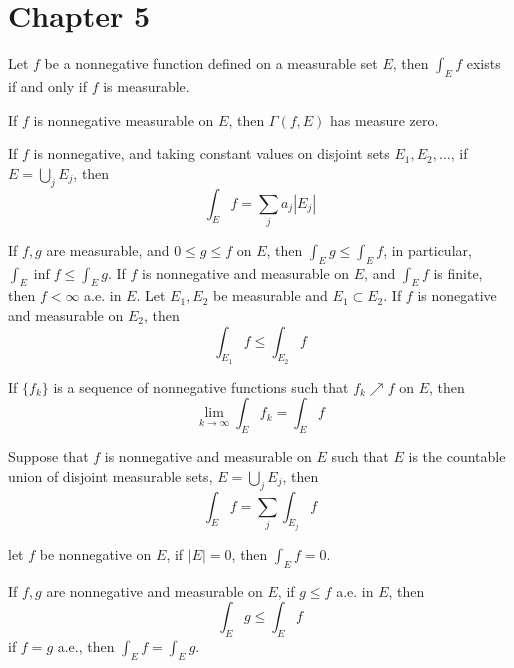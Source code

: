 \documentclass[openany]{book}
\begin{document}
\chapter*{Chapter 5}
\begin{prop}
    Let $f$ be a nonnegative function defined on a measurable set $E$, then $\int_Ef$ exists if and only if $f$ is measurable.
\end{prop}
\begin{prop}
    If $f$ is nonnegative measurable on $E$, then $\Gamma(f,E)$ has measure zero.
\end{prop}
\begin{prop}
    If $f$ is nonnegative, and taking constant values on disjoint sets $E_1,E_2,\dots$, if $E=\bigcup_jE_j$, then 
    \begin{equation*}
        \int_Ef=\sum_ja_j|E_j|
    \end{equation*}
\end{prop}
\begin{prop}
    If $f,g$ are measurable, and $0\leq g\leq f$ on $E$, then $\int_Eg\leq\int_Ef$, in particular, $\int_E\inf f\leq\int_Eg$. If $f$ is nonnegative and measurable on $E$, and $\int_Ef$ is finite, then $f<\infty$ a.e. in $E$. Let $E_1,E_2$ be measurable and $E_1\subset E_2$. If $f$ is nonegative and measurable on $E_2$, then 
    \begin{equation*}
        \int_{E_1}f\leq\int_{E_2}f
    \end{equation*}
\end{prop}
\begin{thm}
    If $\{f_k\}$ is a sequence of nonnegative functions such that $f_k\nearrow f$ on $E$, then 
    \begin{equation*}
        \lim_{k\to\infty}\int_Ef_k=\int_Ef
    \end{equation*}
\end{thm}
\begin{prop}
    Suppose that $f$ is nonnegative and measurable on $E$ such that $E$ is the countable union of disjoint measurable sets, $E=\bigcup_jE_j$, then 
    \begin{equation*}
        \int_Ef=\sum_j\int_{E_j}f
    \end{equation*}
\end{prop}
\begin{prop}
    let $f$ be nonnegative on $E$, if $|E|=0$, then $\int_Ef=0$.

    If $f,g$ are nonnegative and measurable on $E$, if $g\leq f$ a.e. in $E$, then 
    \begin{equation*}
        \int_Eg\leq\int_Ef
    \end{equation*}
    if $f=g$ a.e., then $\int_Ef=\int_Eg$.
\end{prop}
\end{document}
